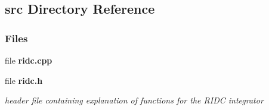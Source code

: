 \subsection{src Directory Reference}
\label{dir_68267d1309a1af8e8297ef4c3efbcdba}
\subsubsection*{Files}
\begin{DoxyCompactItemize}
\item 
file {\bf ridc.\+cpp}
\item 
file {\bf ridc.\+h}
\begin{DoxyCompactList}\small\item\em header file containing explanation of functions for the R\+I\+D\+C integrator \end{DoxyCompactList}\end{DoxyCompactItemize}
